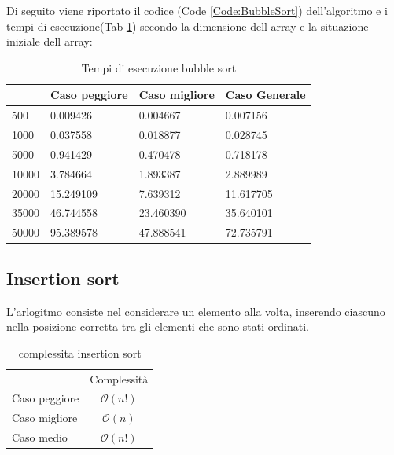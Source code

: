 \documentclass[12pt,a4paper]{report}
\begin{document}
Di seguito viene riportato il codice (Code \ref{Code:BubbleSort}) dell'algoritmo e i tempi di esecuzione(Tab \ref{Tab:Tempi esecuzione Bubblesort}) secondo la dimensione dell array e la situazione iniziale dell array:
	

\begin{table}[ht]
\centering
\begin{tabular}{| l | l | l | l |}
\hline
      & Caso peggiore & Caso migliore & Caso Generale \\ \hline
500   & 0.009426      & 0.004667      & 0.007156      \\ \hline
1000  & 0.037558      & 0.018877      & 0.028745      \\ \hline
5000  & 0.941429      & 0.470478      & 0.718178      \\ \hline
10000 & 3.784664      & 1.893387      & 2.889989      \\ \hline
20000 & 15.249109     & 7.639312      & 11.617705     \\ \hline
35000 & 46.744558     & 23.460390     & 35.640101     \\ \hline
50000 & 95.389578     & 47.888541     & 72.735791    \\ \hline
\end{tabular}
\caption{Tempi di esecuzione bubble sort}
\label{Tab:Tempi esecuzione Bubblesort}
\end{table}

\newpage
\subsection{Insertion sort}
L'arlogitmo consiste nel considerare un elemento alla volta, inserendo ciascuno nella posizione corretta tra gli elementi che sono stati ordinati. 
\begin{table}[ht]
	\centering
	\begin{tabular}{lc}
              & Complessità \\
Caso peggiore &       $ \mathcal{O}(n!)$      \\
Caso migliore &           $ \mathcal{O}(n)$   \\
Caso medio &  $ \mathcal{O}(n!)$\\
\end{tabular}
	\caption{complessita insertion sort}
	\label{Tab:CompInsertionSort}
\end{table}
\end{document}
